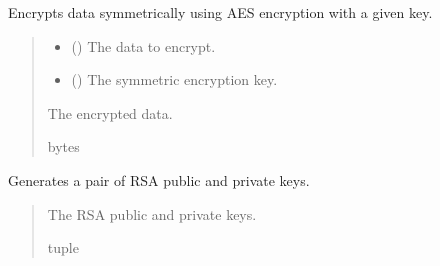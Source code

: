 \documentclass[letterpaper,10pt,english]{sphinxmanual}
\begin{document}
\begin{fulllineitems}
\label{\detokenize{encryption:encryption.encrypt_symmetric}}
\pysigstartsignatures
{}
\pysigstopsignatures
\sphinxAtStartPar
Encrypts data symmetrically using AES encryption with a given key.
\begin{quote}\begin{description}
\begin{itemize}
\item {} 
\sphinxAtStartPar
{} () \textendash{} The data to encrypt.

\item {} 
\sphinxAtStartPar
{} () \textendash{} The symmetric encryption key.

\end{itemize}

\sphinxAtStartPar
The encrypted data.

\sphinxAtStartPar
bytes

\end{description}\end{quote}

\end{fulllineitems}


\begin{fulllineitems}
\label{\detokenize{encryption:encryption.generate_key_pair}}
\pysigstartsignatures
{}
\pysigstopsignatures
\sphinxAtStartPar
Generates a pair of RSA public and private keys.
\begin{quote}\begin{description}
\sphinxAtStartPar
The RSA public and private keys.

\sphinxAtStartPar
tuple

\end{description}\end{quote}

\end{fulllineitems}
\end{document}
